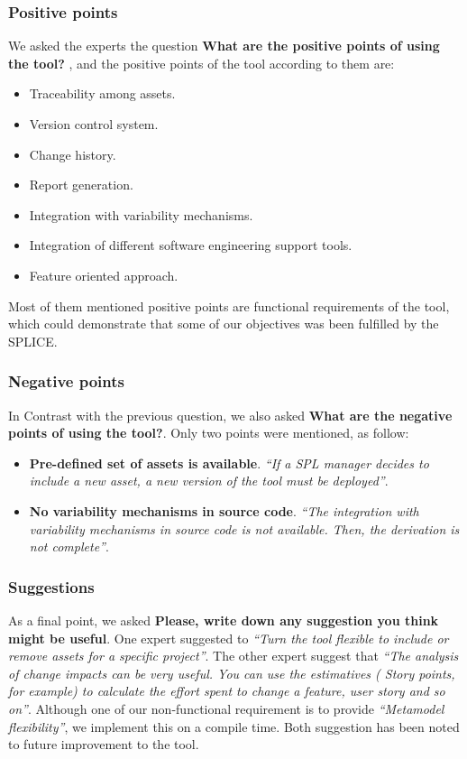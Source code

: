 \subsubsection{Positive points}
We asked the experts the question \textbf{What are the positive points of using the tool? } , and the positive points of the tool according to them are:
\begin{itemize}
\item Traceability among assets.
\item Version control system.
\item Change history.
\item Report generation.
\item Integration with variability mechanisms.
\item Integration of different software engineering support tools.
\item Feature oriented approach.
\end{itemize}
Most of them mentioned positive points are functional requirements of the tool, which could demonstrate that some of our objectives was been fulfilled by the \ac{SPLICE}.

\subsubsection{Negative points}
In Contrast with the previous question, we also asked \textbf{ What are the negative points of using the tool?}. Only two points were mentioned, as follow:
\begin{itemize}

\item \textbf{Pre-defined set of assets is available}. \textit{“If a SPL manager decides to include a new asset, a new version of the tool must be deployed”}.

\item \textbf{No variability mechanisms in source code}. \textit{“The integration with variability mechanisms in source code is not available. Then, the derivation is not complete”}.
\end{itemize}


\subsubsection{Suggestions}
As a final point, we asked \textbf{Please, write down any suggestion you think might be useful}.
One expert suggested to \textit{“Turn the tool flexible to include or remove assets for a specific project”}. The other expert suggest that \textit{“The analysis of change impacts can be very useful. You can use the estimatives ( Story points, for example) to calculate the effort spent to change a feature, user story and so on”}. 
Although one of our non-functional requirement is to provide \textit{“Metamodel flexibility”}, we implement this on a compile time. Both suggestion has been noted to future improvement to the tool.

